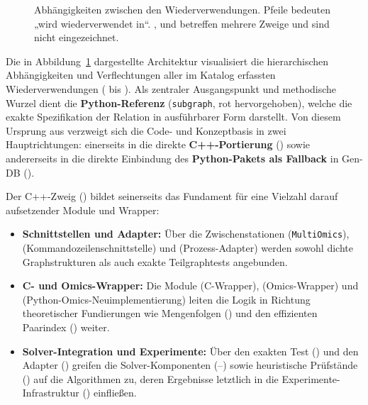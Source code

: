 \begin{figure}
    \caption{Abhängigkeiten zwischen den Wiederverwendungen. Pfeile bedeuten „wird wiederverwendet in“. ,  und  betreffen mehrere Zweige und sind nicht eingezeichnet.}
    \label{abb:baum}
\end{figure}

Die in Abbildung~\ref{abb:baum} dargestellte Architektur visualisiert die hierarchischen Abhängigkeiten und Verflechtungen aller im Katalog erfassten Wiederverwendungen ( bis ). Als zentraler Ausgangspunkt und methodische Wurzel dient die \textbf{Python-Referenz} (\texttt{subgraph}, rot hervorgehoben), welche die exakte Spezifikation der Relation in ausführbarer Form darstellt. Von diesem Ursprung aus verzweigt sich die Code- und Konzeptbasis in zwei Hauptrichtungen: einerseits in die direkte \textbf{C++-Portierung} () sowie andererseits in die direkte Einbindung des \textbf{Python-Pakets als Fallback} in Gen-DB ().

Der C++-Zweig () bildet seinerseits das Fundament für eine Vielzahl darauf aufsetzender Module und Wrapper:
\begin{itemize}
    \item \textbf{Schnittstellen und Adapter:} Über die Zwischenstationen  (\texttt{MultiOmics}),  (Kommandozeilenschnittstelle) und  (Prozess-Adapter) werden sowohl dichte Graphstrukturen als auch exakte Teilgraphtests angebunden.
    \item \textbf{C- und Omics-Wrapper:} Die Module  (C-Wrapper),  (Omics-Wrapper) und  (Python-Omics-Neuimplementierung) leiten die Logik in Richtung theoretischer Fundierungen wie Mengenfolgen () und den effizienten Paarindex () weiter.
    \item \textbf{Solver-Integration und Experimente:} Über den exakten Test () und den Adapter () greifen die Solver-Komponenten (--) sowie heuristische Prüfstände () auf die Algorithmen zu, deren Ergebnisse letztlich in die Experimente-Infrastruktur () einfließen.
\end{itemize}

